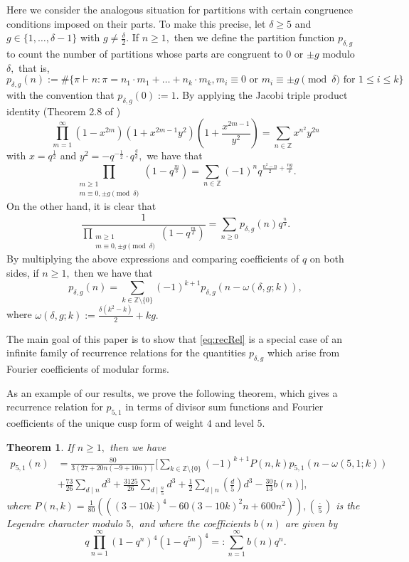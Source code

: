 \documentclass[10pt]{amsart}
\newtheorem{theorem}{Theorem}[section]
\theoremstyle{definition}
\theoremstyle{remark}
\numberwithin{equation}{section}
\newcommand{\leg}[2]{\genfrac{(}{)}{}{}{#1}{#2}}
\newcommand{\Z}{\mathbb Z}
\begin{document}
	Here we consider the analogous situation for partitions with certain congruence conditions imposed on their parts. To make this precise, let $\delta\geq 5$ and $g\in\{1,\ldots,\delta-1\}$ with $g\neq\frac{\delta}{2}.$ If $n\geq 1,$ then we define the partition function $p_{\delta,g}$ to count the number of partitions whose parts are congruent to $0$ or $\pm g$ modulo $\delta,$ that is,
	$$
	p_{\delta,g}(n):=\#\{\pi\vdash n: \pi = n_1\cdot m_1+\ldots+n_k\cdot m_k, m_i\equiv 0\text{ or }m_i\equiv\pm g\pmod\delta\text{ for }1\leq i\leq k\}
	$$
	with the convention that $p_{\delta,g}(0):=1.$ By applying the Jacobi triple product identity (Theorem 2.8 of \cite{Andrews})
	$$
	\prod\limits_{m=1}^\infty (1-x^{2m})(1+x^{2m-1}y^2)\left(1+\frac{x^{2m-1}}{y^2}\right)=\sum\limits_{n\in\Z} x^{n^2}y^{2n}
	$$
	with $x=q^{\frac{1}{2}}$ and $y^2=-q^{-\frac{1}{2}}\cdot q^{\frac{g}{\delta}},$ we have that
	\begin{equation}\label{eq:gEtaExp}
	\prod\limits_{\substack{m\geq 1 \\ m\equiv 0,\pm g\pmod\delta}} (1-q^{\frac{m}{\delta}})=\sum\limits_{n\in\Z}(-1)^nq^{\frac{n^2-n}{2}+\frac{ng}{\delta}}.
	\end{equation}
	On the other hand, it is clear that
	$$
	\frac{1}{\prod\limits_{\substack{m\geq 1 \\ m\equiv 0,\pm g\pmod\delta}}(1-q^{\frac{m}{\delta}})} = \sum\limits_{n\geq 0} p_{\delta,g}(n)q^{\frac{n}{\delta}}.
	$$
	By multiplying the above expressions and comparing coefficients of $q$ on both sides, if $n\geq 1,$ then we have that
	\begin{equation}\label{eq:recRel}
	p_{\delta,g}(n)=\sum\limits_{k\in\Z\setminus\{0\}}(-1)^{k+1}p_{\delta,g}(n-\omega(\delta,g;k)),
	\end{equation}
	where $\omega(\delta,g;k):=\frac{\delta(k^2-k)}{2}+kg.$ 
	
	The main goal of this paper is to show that \eqref{eq:recRel} is a special case of an infinite family of recurrence relations for the quantities $p_{\delta,g}$ which arise from Fourier coefficients of modular forms. 
	
	As an example of our results, we prove the following theorem, which gives a recurrence relation for $p_{5,1}$ in terms of divisor sum functions and Fourier coefficients of the unique cusp form of weight $4$ and level $5.$ 
	
	\begin{theorem}\label{thm:ExRecurDelta5g1}
		If $n\geq 1,$ then we have
			\begin{align*}
			p_{5,1}(n) &= \frac{80}{3(27+20n(-9+10n))}\Bigg[\sum\limits_{k\in\Z\setminus\{0\}}(-1)^{k+1}P(n,k)p_{5,1}(n-\omega(5,1;k)) \\
			&+\frac{73}{26}\sum\limits_{d\mid n}d^3+\frac{3125}{26}\sum\limits_{d\mid \frac{n}{5}}d^3+\frac{1}{2}\sum\limits_{d\mid n}\leg{d}{5}d^3-\frac{30}{13}b(n)\Bigg],
			\end{align*}
			where $P(n,k)=\frac{1}{80}\left(((3-10k)^4-60(3-10k)^2n+600n^2)\right), \leg{\cdot}{5}$ is the Legendre character modulo $5,$ and where the coefficients $b(n)$ are given by $$
			q\prod\limits_{n=1}^\infty(1-q^n)^4(1-q^{5n})^4=:\sum\limits_{n=1}^{\infty}b(n)q^n.
			$$
	\end{theorem}
	
\end{document}

